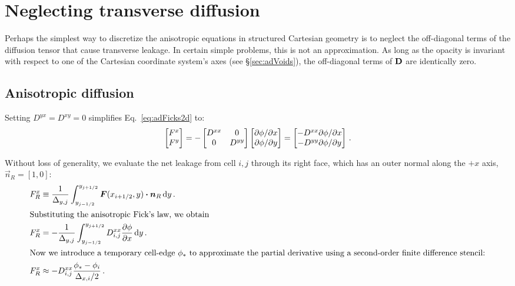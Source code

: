 \section{Neglecting transverse diffusion}\label{sec:discreteDiag}

Perhaps the simplest way to discretize the anisotropic equations in
structured Cartesian geometry is to neglect the off-diagonal terms of the
diffusion tensor that cause transverse leakage.
In certain simple problems, this is not an approximation. As long as the
opacity is invariant with respect to one of the Cartesian coordinate system's
axes (see \S\ref{sec:adVoids}), the off-diagonal terms of $\mathbf{D}$ are
identically zero.

\subsection{Anisotropic diffusion}
Setting $D^{yx}=D^{xy}=0$ simplifies Eq.~\eqref{eq:adFicks2d} to:
\begin{equation*}
  \begin{bmatrix}
    F^{x} \\
    F^{y}
  \end{bmatrix}
  = -
  \begin{bmatrix}
    D^{xx} & 0 \\
    0 & D^{yy}
  \end{bmatrix}
  \begin{bmatrix}
    {\partial \phi}/{\partial x} \\
    {\partial \phi}/{\partial y}
  \end{bmatrix}
  = 
  \begin{bmatrix}
    - D^{xx} {\partial \phi}/{\partial x} \\
    - D^{yy} {\partial \phi}/{\partial y}
  \end{bmatrix}
  \,.
\end{equation*}

Without loss of generality, we evaluate the net leakage from cell
$i,j$ through its right face, which has an outer normal along the $+x$ axis,
$\vec{n}_R = [1,0]$:
\begin{align} \nonumber
  F_R^x &\equiv \frac{1}{\Delta_{y,j}} \int_{y_{j-1/2}}^{y_{j+1/2}}
  \bm{F}(x_{i+1/2}, y) \bm{\cdot} \bm{n}_R \mathop{}\!\mathrm{d} y\,.
  \\
  \intertext{Substituting the anisotropic Fick's law, we obtain} \nonumber
  F_R^x &= - \frac{1}{\Delta_{y,j}} \int_{y_{j-1/2}}^{y_{j+1/2}}
  D_{i,j}^{xx} \frac{\partial \phi}{\partial x} \mathop{}\!\mathrm{d} y \,.
  \\ 
  \intertext{Now we introduce a temporary cell-edge $\phi_*$ to
  approximate the partial derivative using a second-order finite difference
  stencil:}
  \label{eq:diagFrx}
  F_R^x &\approx - 
  D_{i,j}^{xx} \frac{\phi_* - \phi_{i}}{\Delta_{x,i}/2} \,.
\end{align}

